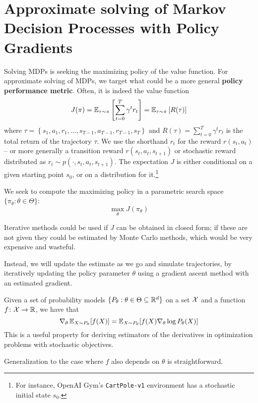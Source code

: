 \documentclass[../course-notes.tex]{subfiles}
\begin{document}
\chapter{Approximate solving of Markov Decision Processes with Policy Gradients}


Solving MDPs is seeking the maximizing policy of the value function. For approximate solving of MDPs, we target what could be a more general \textbf{\bluefont policy performance metric}. Often, it is indeed the value function
\begin{equation}\label{eq:PolicyPerfCumReward}
J(\pi) = \operatorname{\mathbb{E}}_{\tau\sim\pi}\left[
\sum_{t=0}^{T} \gamma^t r_t
\right] =
\operatorname{\mathbb{E}}_{\tau\sim\pi}
\left[R(\tau)\right]
\end{equation}
where $\tau = \left\{ s_1,a_1,r_1,\ldots,s_{T-1},a_{T-1},r_{T-1},s_{T}\right\}$ and $R(\tau) = \sum_{t=0}^T \gamma^t r_t$ is the total return of the trajectory $\tau$.
We use the shorthand $r_t$ for the reward $r(s_t, a_t)$ -- or more generally a transition reward $r(s_t, a_t, s_{t+1})$ or stochastic reward distributed as $r_t \sim p(\cdot, s_t, a_t, s_{t+1})$. The expectation $J$ is either conditional on a given starting point $s_0$, or on a distribution for it.\footnote{For instance, OpenAI Gym's \texttt{CartPole-v1} environment has a stochastic initial state $s_0$.}

We seek to compute the maximizing policy in a parametric search space $\{\pi_\theta: \theta\in\Theta\}$:
\[
\max_\theta J(\pi_\theta)
\]

Iterative methods could be used if $J$ can be obtained in closed form; if these are not given they could be estimated by Monte Carlo methods, which would be very expensive and wasteful.

Instead, we will update the estimate as we go and simulate trajectories, by iteratively updating the policy parameter $\theta$ using a gradient ascent method with an estimated gradient.

\begin{prop}\label{prop:parametricGradient}
	Given a set of probability models $\{P_\theta: \theta\in\Theta\subseteq \mathbb{R}^d\}$ on a set $\mathcal{X}$ and a function $f\colon \mathcal{X}\to \mathbb{R}$, we have that
	\[
	\nabla_\theta \operatorname{\mathbb{E}}_{X\sim P_\theta}[f(X)]
	= \operatorname{\mathbb{E}}_{X\sim P_\theta}[f(X)\nabla_\theta \log P_\theta(X)]
	\]
	This is a useful property for deriving estimators of the derivatives in optimization problems with stochastic objectives.
	
	Generalization to the case where $f$ also depends on $\theta$ is straightforward.
\end{prop}
\end{document}
